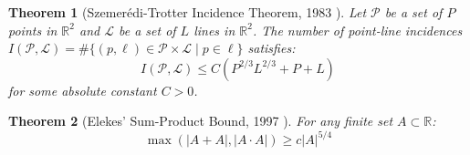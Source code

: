 \documentclass[11pt,a4paper]{article}
\newtheorem{theorem}{Theorem}[section]
\theoremstyle{definition}
\begin{document}
\begin{theorem}[Szemer\'edi-Trotter Incidence Theorem, 1983 \cite{szemeredi1983}]\label{thm:st}
Let $\mathcal{P}$ be a set of $P$ points in $\mathbb{R}^2$ and $\mathcal{L}$ be a set of $L$ lines in $\mathbb{R}^2$.
The number of point-line incidences $I(\mathcal{P}, \mathcal{L}) = \#\{(p, \ell) \in \mathcal{P} \times \mathcal{L} \mid p \in \ell\}$ satisfies:
\begin{equation}\label{eq:st_bound}
I(\mathcal{P}, \mathcal{L}) \le C \left( P^{2/3} L^{2/3} + P + L \right)
\end{equation}
for some absolute constant $C > 0$.
\end{theorem}

\begin{theorem}[Elekes' Sum-Product Bound, 1997 \cite{elekes1997}]\label{thm:elekes}
For any finite set $A \subset \mathbb{R}$:
\begin{equation}\label{eq:elekes_bound}
\max(|A + A|, |A \cdot A|) \ge c |A|^{5/4}
\end{equation}
\end{theorem}
\end{document}
